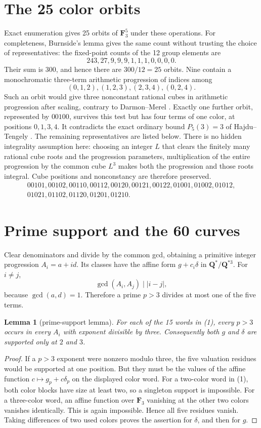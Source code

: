 \documentclass[10pt]{article}
\newtheorem{lemma}[theorem]{Lemma}
\newcommand{\Q}{\mathbf Q}
\newcommand{\F}{\mathbf F}
\begin{document}
\section{The 25 color orbits}
Exact enumeration gives 25 orbits of $\F_3^5$ under these operations.  For
completeness, Burnside's lemma gives the same count without trusting the
choice of representatives: the fixed-point counts of the 12 group elements
are
\[
243,27,9,9,9,1,1,1,0,0,0,0.
\]
Their sum is 300, and hence there are $300/12=25$ orbits.  Nine
contain a monochromatic three-term arithmetic progression of indices among
\[
(0,1,2),(1,2,3),(2,3,4),(0,2,4).
\]
Such an orbit would give three nonconstant rational cubes in arithmetic
progression after scaling, contrary to Darmon--Merel \cite{DM}.  Exactly one
further orbit, represented by $00100$, survives this test but has four terms
of one color, at positions $0,1,3,4$.  It contradicts the exact ordinary
bound $P_5(3)=3$ of Hajdu--Tengely \cite{HT}.  The remaining representatives
are listed below.  There is no hidden integrality assumption here: choosing
an integer $L$ that clears the finitely many rational cube roots and the
progression parameters, multiplication of the entire progression by the
common cube $L^3$ makes both the progression and those roots integral.
Cube positions and nonconstancy are therefore preserved.
\begin{gather*}
00101,00102,00110,00112,00120,00121,00122,01001,01002,01012,\\
01021,01102,01120,01201,01210.                         \tag{1}
\end{gather*}

\section{Prime support and the 60 curves}
Clear denominators and divide by the common gcd, obtaining a primitive
integer progression $A_i=a+id$.  Its classes have the affine form
$g+c_i\delta$ in $\Q^*/\Q^{*3}$.  For $i\ne j$,
\[
\gcd(A_i,A_j)\mid |i-j|,
\]
because $\gcd(a,d)=1$.  Therefore a prime $p>3$ divides at most one of the
five terms.

\begin{lemma}[prime-support lemma]\label{lem:support}
For each of the 15 words in (1), every $p>3$ occurs in every $A_i$ with
exponent divisible by three.  Consequently both $g$ and $\delta$ are
supported only at $2$ and $3$.
\end{lemma}
\begin{proof}
If a $p>3$ exponent were nonzero modulo three, the five valuation residues
would be supported at one position.  But they must be the values of the
affine function $c\mapsto g_p+c\delta_p$ on the displayed color word.
For a two-color word in (1), both color blocks have size at least two, so a
singleton support is impossible.  For a three-color word, an affine function
over $\F_3$ vanishing at the other two colors vanishes identically.  This is
again impossible.  Hence all five residues vanish.  Taking differences of
two used colors proves the assertion for $\delta$, and then for $g$.
\end{proof}
\end{document}
